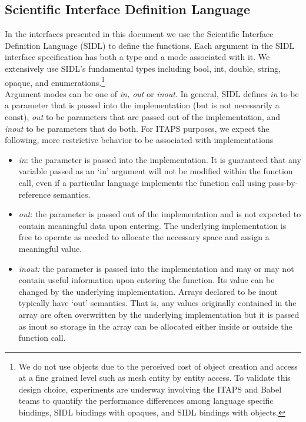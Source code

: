 \documentclass{article}
\begin{document}
\subsection{Scientific Interface Definition Language}

In the interfaces presented in this document we use the Scientific 
Interface Definition Language (SIDL) to define the functions. 
Each argument in the SIDL interface specification has both a 
type and a mode associated with it. We extensively use SIDL's 
fundamental types including bool, int, double, string, opaque, 
and enumerations.\footnote{We do not use objects due to the perceived 
cost of object creation and access at a fine grained level such 
as mesh entity by entity access. To validate this design choice, 
experiments are underway involving the ITAPS and Babel teams to 
quantify the performance differences among language specific 
bindings, SIDL bindings with opaques, and SIDL bindings with 
objects.} \\

Argument modes can be one of \emph{in, out} or \emph{inout.} In general, 
SIDL defines \emph{in} to be a parameter that is passed into the 
implementation (but is not necessarily a const), \emph{out} to be 
parameters that are passed out of the implementation, and \emph{inout} 
to be parameters that do both. For ITAPS purposes, we expect the 
following, more restrictive behavior to be associated with implementations

\begin{itemize}
\item
\emph{in}: the parameter is passed into the implementation. It is 
guaranteed that any variable passed as an `in' argument will not 
be modified within the function call, even if a particular language 
implements the function call using pass-by-reference semantics. 

\item\emph{out}: the parameter is passed out of the implementation 
and is not expected to contain meaningful data upon entering. 
The underlying implementation is free to operate as needed to 
allocate the necessary space and assign a meaningful value.

\item  \emph{inout:} the parameter is passed into the implementation 
and may or may not contain useful information upon entering the 
function. Its value can be changed by the underlying implementation. 
Arrays declared to be inout typically have `out' semantics. That 
is, any values originally contained in the array are often overwritten 
by the underlying implementation but it is passed as inout so 
storage in the array can be allocated either inside or outside 
the function call.
\end{itemize}
\end{document}
